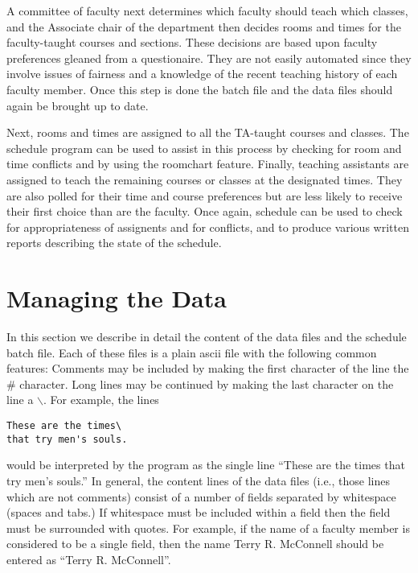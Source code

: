 A committee of faculty next determines which faculty should teach which 
classes, and the Associate chair of the department then  decides
rooms and times
for the faculty-taught courses and sections. These decisions are based upon
faculty preferences gleaned from a questionaire. They are not easily 
automated since they involve issues of fairness and a knowledge of the
recent teaching history of each faculty member. Once this step is done the
batch file and the data files should again be brought up to date. 

Next, rooms and times are assigned to all the TA-taught courses and classes.
The schedule program can be used to assist in this process by checking for
room and time conflicts and by using the roomchart feature. Finally, teaching
assistants are assigned to teach  the remaining courses or classes
at the designated times. They are also polled for their time and course
preferences but are less likely to receive their first choice than are the
faculty.  Once again, schedule can be used to check for appropriateness of
assignents  and for conflicts, and to produce various written reports 
describing the
state of the schedule.  

\section{Managing the Data}

In this section we describe in detail the content of the data files and the
schedule batch file. Each of these files is a plain ascii file with the 
following common features: Comments may be included by making the first
character of the line the \# character. Long lines may be continued by
making the last character on the line a $\backslash$. For example,
the lines
\smallskip
\begin{verbatim}
These are the times\
that try men's souls. 
\end{verbatim}
\smallskip
would be interpreted by the program as the single line ``These are the
times that try men's souls.'' In general, the content lines of the
data files (i.e., those lines which are not comments) consist of a number
of fields separated by whitespace (spaces and tabs.) If whitespace must
be included within a field then the field must be surrounded with quotes.
For example, if the name of a faculty member is considered to be a single
field, then the name Terry R. McConnell should be entered as ``Terry R. McConnell''. 

